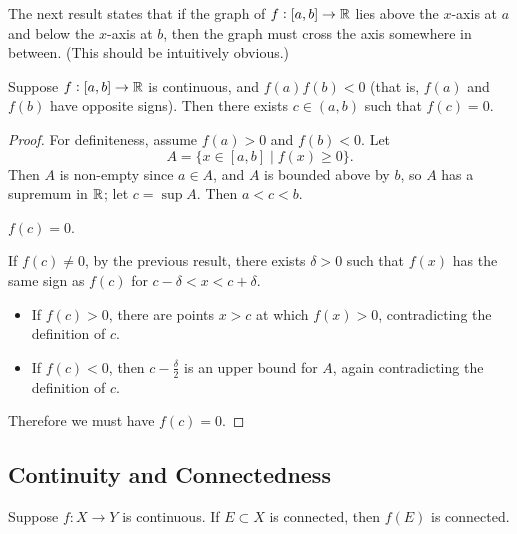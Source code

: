 The next result states that if the graph of $f:[a,b]\to\mathbb R$ lies above the $x$-axis at $a$ and below the $x$-axis at $b$, then the graph must cross the axis somewhere in between. (This should be intuitively obvious.)

\begin{theorem}[Bolzano]
Suppose $f:[a,b]\to\mathbb R$ is continuous, and $f(a)f(b)<0$ (that is, $f(a)$ and $f(b)$ have opposite signs). Then there exists $c\in(a,b)$ such that $f(c)=0$.
\end{theorem}

\begin{proof}
For definiteness, assume $f(a)>0$ and $f(b)<0$. Let
\[A=\{x\in[a,b]\mid f(x)\ge0\}.\]
Then $A$ is non-empty since $a\in A$, and $A$ is bounded above by $b$, so $A$ has a supremum in $\mathbb R$; let $c=\sup A$. Then $a<c<b$.
\begin{claim}
$f(c)=0$.
\end{claim}
If $f(c)\neq0$, by the previous result, there exists $\delta>0$ such that $f(x)$ has the same sign as $f(c)$ for $c-\delta<x<c+\delta$.
\begin{itemize}
\item If $f(c)>0$, there are points $x>c$ at which $f(x)>0$, contradicting the definition of $c$.
\item If $f(c)<0$, then $c-\frac{\delta}{2}$ is an upper bound for $A$, again contradicting the definition of $c$.
\end{itemize}
Therefore we must have $f(c)=0$.
\end{proof}
\pagebreak

\subsection{Continuity and Connectedness}
\begin{proposition}
Suppose $f:X\to Y$ is continuous. If $E\subset X$ is connected, then $f(E)$ is connected.
\end{proposition}


